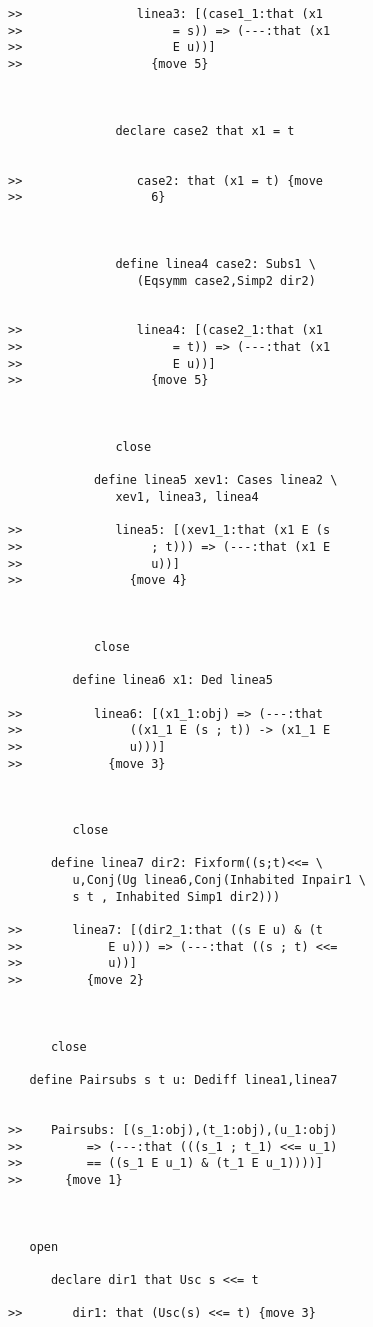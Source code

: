 \documentclass[12pt]{article}
\begin{document}
\begin{verbatim}
>>                linea3: [(case1_1:that (x1
>>                     = s)) => (---:that (x1
>>                     E u))]
>>                  {move 5}



               declare case2 that x1 = t


>>                case2: that (x1 = t) {move
>>                  6}



               define linea4 case2: Subs1 \
                  (Eqsymm case2,Simp2 dir2)


>>                linea4: [(case2_1:that (x1
>>                     = t)) => (---:that (x1
>>                     E u))]
>>                  {move 5}



               close

            define linea5 xev1: Cases linea2 \
               xev1, linea3, linea4

>>             linea5: [(xev1_1:that (x1 E (s
>>                  ; t))) => (---:that (x1 E
>>                  u))]
>>               {move 4}



            close

         define linea6 x1: Ded linea5

>>          linea6: [(x1_1:obj) => (---:that
>>               ((x1_1 E (s ; t)) -> (x1_1 E
>>               u)))]
>>            {move 3}



         close

      define linea7 dir2: Fixform((s;t)<<= \
         u,Conj(Ug linea6,Conj(Inhabited Inpair1 \
         s t , Inhabited Simp1 dir2)))

>>       linea7: [(dir2_1:that ((s E u) & (t
>>            E u))) => (---:that ((s ; t) <<=
>>            u))]
>>         {move 2}



      close

   define Pairsubs s t u: Dediff linea1,linea7


>>    Pairsubs: [(s_1:obj),(t_1:obj),(u_1:obj)
>>         => (---:that (((s_1 ; t_1) <<= u_1)
>>         == ((s_1 E u_1) & (t_1 E u_1))))]
>>      {move 1}



   open

      declare dir1 that Usc s <<= t

>>       dir1: that (Usc(s) <<= t) {move 3}




\end{verbatim}
\end{document}
